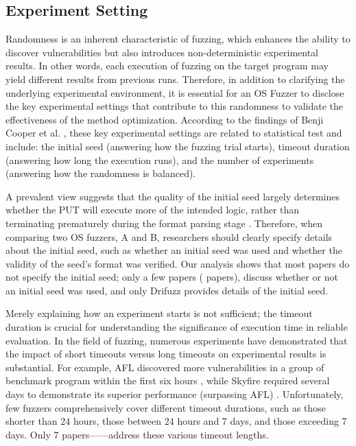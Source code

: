 \subsection{Experiment Setting}
Randomness is an inherent characteristic of fuzzing, which enhances the ability to discover vulnerabilities but also introduces non-deterministic experimental results. In other words, each execution of fuzzing on the target program may yield different results from previous runs. Therefore, in addition to clarifying the underlying experimental environment, it is essential for an OS Fuzzer to disclose the key experimental settings that contribute to this randomness to validate the effectiveness of the method optimization. According to the findings of Benji Cooper et al. \cite{Klees2018EvaluatingFT}, these key experimental settings are related to statistical test \cite{Ziegel1977AnIT} and include: the initial seed (answering how the fuzzing trial starts), timeout duration (answering how long the execution runs), and the number of experiments (answering how the randomness is balanced).


A prevalent view suggests that the quality of the initial seed largely determines whether the PUT will execute more of the intended logic, rather than terminating prematurely during the format parsing stage \cite{AFL, Rawat2017VUzzerAE, Rebert2014OptimizingSS, Wang2017SkyfireDS}. Therefore, when comparing two OS fuzzers, A and B, researchers should clearly specify details about the initial seed, such as whether an initial seed was used and whether the validity of the seed's format was verified. Our analysis shows that most papers do not specify the initial seed; only a few papers ( papers), discuss whether or not an initial seed was used, and only Drifuzz \cite{shen2022drifuzz} provides details of the initial seed.


Merely explaining how an experiment starts is not sufficient; the timeout duration is crucial for understanding the significance of execution time in reliable evaluation. In the field of fuzzing, numerous experiments have demonstrated that the impact of short timeouts versus long timeouts on experimental results is substantial. For example, AFL discovered more vulnerabilities in a group of benchmark program within the first six hours \cite{Bx00F6hme2016CoverageBasedGF}, while Skyfire \cite{Wang2017SkyfireDS} required several days to demonstrate its superior performance (surpassing AFL) \cite{Klees2018EvaluatingFT}. Unfortunately, few fuzzers comprehensively cover different timeout durations, such as those shorter than 24 hours, those between 24 hours and 7 days, and those exceeding 7 days. Only 7 papers—\cite{xu2020krace,hao2023syzdescribe,tan2023syzdirect,wang2021syzvegas,Hao2022DemystifyingTD,bulekov2023FUZZNG,Liu2023LFuzz}—address these various timeout lengths.


